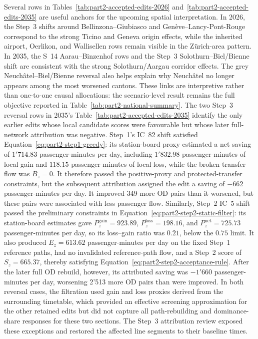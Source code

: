 \documentclass[preprint,12pt]{elsarticle}
\begin{document}
Several rows in Tables~\ref{tab:part2-accepted-edits-2026} and~\ref{tab:part2-accepted-edits-2035} are useful anchors for the upcoming spatial interpretation. In 2026, the Step~3 shifts around Bellinzona--Giubiasco and Genève--Lancy-Pont-Rouge correspond to the strong Ticino and Geneva origin effects, while the inherited airport, Oerlikon, and Wallisellen rows remain visible in the Zürich-area pattern. In 2035, the S~14 Aarau--Binzenhof rows and the Step~3 Solothurn--Biel/Bienne shift are consistent with the strong Solothurn/Aargau corridor effects. The grey Neuchâtel--Biel/Bienne reversal also helps explain why Neuchâtel no longer appears among the most worsened cantons. These links are interpretive rather than one-to-one causal allocations: the scenario-level result remains the full objective reported in Table~\ref{tab:part2-national-summary}.
\newpage
The two Step~3 reversal rows in 2035's Table~\ref{tab:part2-accepted-edits-2035} identify the only earlier edits whose local candidate scores were favourable but whose later full-network attribution was negative. Step~1's IC~82 shift satisfied Equation~\eqref{eq:part2-step1-greedy}: its station-board proxy estimated a net saving of \(1'714.83\) passenger-minutes per day, including \(1'832.98\) passenger-minutes of local gain and \(118.15\) passenger-minutes of local loss, while the broken-transfer flow was \(B_z=0\). It therefore passed the positive-proxy and protected-transfer constraints, but the subsequent attribution assigned the edit a saving of \(-662\) passenger-minutes per day. It improved 349 more OD pairs than it worsened, but these pairs were associated with less passenger flow. Similarly, Step~2 IC~5 shift passed the preliminary constraints in Equation~\eqref{eq:part2-step2-static-filter}: its station-board estimates gave \(P^{\mathrm{gain}}_z=923.89\), \(P^{\mathrm{loss}}_z=198.16\), and \(P^{\mathrm{net}}_z=725.73\) passenger-minutes per day, so its loss--gain ratio was \(0.21\), below the \(0.75\) limit. It also produced \(E_z=613.62\) passenger-minutes per day on the fixed Step~1 reference paths, had no invalidated reference-path flow, and a Step~2 score of \(S_z=665.37\), thereby satisfying Equation~\eqref{eq:part2-step2-acceptance-rule}. After the later full OD rebuild, however, its attributed saving was \(-1'660\) passenger-minutes per day, worsening 2'513 more OD pairs than were improved. In both reversal cases, the filtration used gain and loss proxies derived from the surrounding timetable, which provided an effective screening approximation for the other retained edits but did not capture all path-rebuilding and dominance-share responses for these two sections. The Step~3 attribution review exposed these exceptions and restored the affected line segments to their baseline times.
\end{document}
